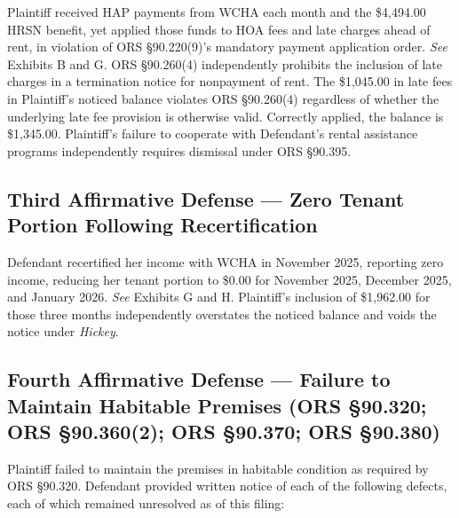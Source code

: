 \documentclass[12pt,letterpaper]{article}
\begin{document}
Plaintiff received HAP payments from WCHA each month and the \$4,494.00 HRSN benefit, yet applied those funds to HOA fees and late charges ahead of rent, in violation of ORS \S90.220(9)'s mandatory payment application order. \textit{See} Exhibits B and G. ORS \S90.260(4) independently prohibits the inclusion of late charges in a termination notice for nonpayment of rent. The \$1,045.00 in late fees in Plaintiff's noticed balance violates ORS \S90.260(4) regardless of whether the underlying late fee provision is otherwise valid. Correctly applied, the balance is \$1,345.00. Plaintiff's failure to cooperate with Defendant's rental assistance programs independently requires dismissal under ORS \S90.395.

\subsection{Third Affirmative Defense --- Zero Tenant Portion Following Recertification}

Defendant recertified her income with WCHA in November 2025, reporting zero income, reducing her tenant portion to \$0.00 for November 2025, December 2025, and January 2026. \textit{See} Exhibits G and H. Plaintiff's inclusion of \$1,962.00 for those three months independently overstates the noticed balance and voids the notice under \textit{Hickey}.

\subsection{Fourth Affirmative Defense --- Failure to Maintain Habitable Premises (ORS \S90.320; ORS \S90.360(2); ORS \S90.370; ORS \S90.380)}

Plaintiff failed to maintain the premises in habitable condition as required by ORS \S90.320. Defendant provided written notice of each of the following defects, each of which remained unresolved as of this filing:
\end{document}
